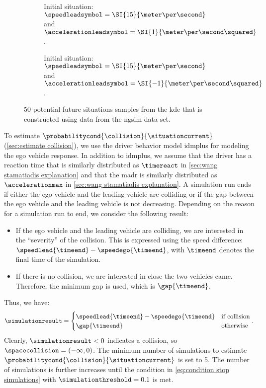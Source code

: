 \setlength{\figurewidth}{.49\linewidth}
\setlength{\figureheight}{.7\figurewidth}
\begin{figure}
	\centering
	\begin{subfigure}{.49\linewidth}
		\centering
		
		\caption{Initial situation: $\speedleadsymbol=\SI{15}{\meter\per\second}$ and $\accelerationleadsymbol=\SI{1}{\meter\per\second\squared}$.}
		\label{fig:speed profiles accelerating}
	\end{subfigure}
	\begin{subfigure}{.49\linewidth}
		\centering
		
		\caption{Initial situation: $\speedleadsymbol=\SI{15}{\meter\per\second}$ and $\accelerationleadsymbol=\SI{-1}{\meter\per\second\squared}$.}
		\label{fig:speed profiles decelerating}
	\end{subfigure}
	\caption{50 potential future situations samples from the \ac{kde} that is constructed using data from the \ac{ngsim} data set.}
	\label{fig:speed profiles}
\end{figure}

To estimate $\probabilitycond{\collision}{\situationcurrent}$ (\cref{sec:estimate collision}), we use the driver behavior model \ac{idmplus} \autocite{schakel2010effects} for modeling the ego vehicle response.
In addition to \ac{idmplus}, we assume that the driver has a reaction time that is similarly distributed as $\timereact$ in \cref{sec:wang stamatiadis explanation} and that the \ac{madr} is similarly distributed as $\accelerationmax$ in \cref{sec:wang stamatiadis explanation}.
\cstartb A simulation run ends if either the ego vehicle and the leading vehicle are colliding or if the gap between the ego vehicle and the leading vehicle is not decreasing. 
Depending on the reason for a simulation run to end, we consider the following result:
\begin{itemize}
	\item If the ego vehicle and the leading vehicle are colliding, we are interested in the ``severity'' of the collision. 
	This is expressed using the speed difference: $\speedlead{\timeend} - \speedego{\timeend}$, with $\timeend$ denotes the final time of the simulation.
	\item If there is no collision, we are interested in close the two vehicles came.
	Therefore, the minimum gap is used, which is $\gap{\timeend}$.
\end{itemize}
Thus, we have: \cendb
\begin{equation}
	\simulationresult = \begin{cases}
		\speedlead{\timeend} - \speedego{\timeend} & \text{if collision} \\
		\gap{\timeend} & \text{otherwise}
	\end{cases}.
\end{equation}
Clearly, $\simulationresult<0$ indicates a collision, so $\spacecollision=(-\infty, 0)$.
\cstarta The minimum number of simulations to estimate $\probabilitycond{\collision}{\situationcurrent}$ is set to 5. 
The number of simulations is further increases until the condition in \cref{eq:condition stop simulations} with $\simulationthreshold=0.1$ is met. \cenda

